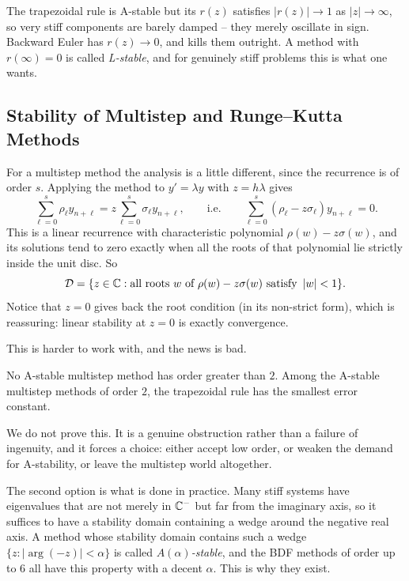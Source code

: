 \documentclass[a4paper]{scrartcl}
\providecommand{\abs}[1]{\left\lvert#1\right\rvert}
\renewcommand{\abs}[1]{\left\lvert#1\right\rvert}
\begin{document}
\begin{remark}
  The trapezoidal rule is A-stable but its $r(z)$ satisfies $\abs{r(z)} \to 1$ as $\abs{z}\to\infty$, so very stiff components are barely damped -- they merely oscillate in sign. Backward Euler has $r(z) \to 0$, and kills them outright. A method with $r(\infty) = 0$ is called \emph{L-stable}, and for genuinely stiff problems this is what one wants.
\end{remark}

\subsection{Stability of Multistep and Runge--Kutta Methods}

For a multistep method the analysis is a little different, since the recurrence is of order $s$. Applying the method to $y' = \lambda y$ with $z = h\lambda$ gives
$$
\sum_{\ell=0}^{s}\rho_\ell y_{n+\ell} = z\sum_{\ell=0}^s \sigma_\ell y_{n+\ell}, \qquad \text{i.e.}\qquad \sum_{\ell=0}^s (\rho_\ell - z\sigma_\ell)y_{n+\ell} = 0.
$$
This is a linear recurrence with characteristic polynomial $\rho(w) - z\sigma(w)$, and its solutions tend to zero exactly when all the roots of that polynomial lie strictly inside the unit disc. So
$$
\mathcal{D} = \{z \in \C : \text{all roots } w \text{ of } \rho(w) - z\sigma(w) \text{ satisfy } \abs{w} < 1\}.
$$
Notice that $z = 0$ gives back the root condition (in its non-strict form), which is reassuring: linear stability at $z = 0$ is exactly convergence.

This is harder to work with, and the news is bad.

\begin{theorem}
  No A-stable multistep method has order greater than $2$. Among the A-stable multistep methods of order $2$, the trapezoidal rule has the smallest error constant.
\end{theorem}

We do not prove this. It is a genuine obstruction rather than a failure of ingenuity, and it forces a choice: either accept low order, or weaken the demand for A-stability, or leave the multistep world altogether.

The second option is what is done in practice. Many stiff systems have eigenvalues that are not merely in $\mathbb{C}^-$ but far from the imaginary axis, so it suffices to have a stability domain containing a wedge around the negative real axis. A method whose stability domain contains such a wedge $\{z : \abs{\arg(-z)} < \alpha\}$ is called \emph{$A(\alpha)$-stable}, and the BDF methods of order up to $6$ all have this property with a decent $\alpha$. This is why they exist.
\end{document}
